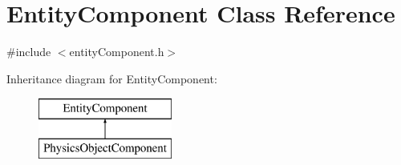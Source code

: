 \hypertarget{class_entity_component}{}\section{Entity\+Component Class Reference}
\label{class_entity_component}


{\ttfamily \#include $<$entity\+Component.\+h$>$}

Inheritance diagram for Entity\+Component\+:\begin{figure}[H]
\begin{center}
\leavevmode
\includegraphics[height=2.000000cm]{class_entity_component}
\end{center}
\end{figure}
